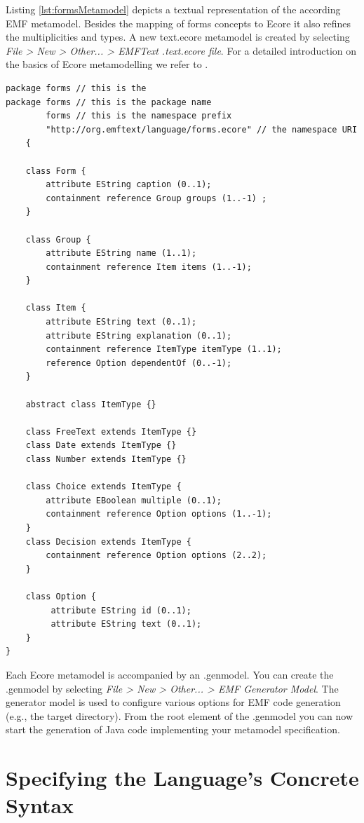 	Listing \ref{lst:formsMetamodel} depicts a textual representation of the
	according EMF metamodel. Besides the mapping of forms concepts to Ecore it
	also refines the multiplicities and types. A new text.ecore metamodel is
	created by selecting \emph{File > New > Other... > EMFText .text.ecore
	file}. For a detailed introduction on the basics of Ecore metamodelling we
	refer to .

	
	\lstset{language=textecore}
	\begin{lstlisting}[label=lst:formsMetamodel, caption=Metamodel for the
	exemplary forms language written in text.ecore] package forms // this is the
package forms // this is the package name 
        forms // this is the namespace prefix
        "http://org.emftext/language/forms.ecore" // the namespace URI 
	{

	class Form {
		attribute EString caption (0..1);
		containment reference Group groups (1..-1) ;
	}
	
	class Group {
		attribute EString name (1..1);
		containment reference Item items (1..-1);
	}

	class Item {
		attribute EString text (0..1);
		attribute EString explanation (0..1);
		containment reference ItemType itemType (1..1);
		reference Option dependentOf (0..-1);
	}

	abstract class ItemType {}

	class FreeText extends ItemType {}
	class Date extends ItemType {}	
	class Number extends ItemType {}

	class Choice extends ItemType {
		attribute EBoolean multiple (0..1);
		containment reference Option options (1..-1);
	}
	class Decision extends ItemType {
		containment reference Option options (2..2);
	}
		
	class Option {
		 attribute EString id (0..1);
		 attribute EString text (0..1);
	}
}

	\end{lstlisting}
	
Each Ecore metamodel is accompanied by an .genmodel. You can create the
	.genmodel by selecting \emph{File > New > Other... > EMF Generator Model}.
	The generator model is used to configure various options for EMF code
	generation (e.g., the target directory). From the root element of the .genmodel
	you can now start the generation of Java code implementing your metamodel
	specification.

\section{Specifying the Language's Concrete Syntax}
\label{sec:process_specification}


